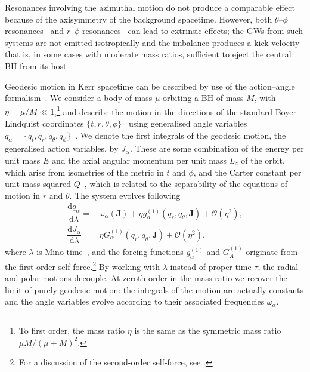\documentclass[aps,prd,amsfonts,amssymb,amsmath,nofootinbib,showpacs,superscriptaddress,twocolumn,floatfix]{revtex4-1}
\newcommand{\dd}{\ensuremath{\mathrm{d}}}
\newcommand{\diff}[2]{\ensuremath{\dfrac{\dd {#1}}{\dd {#2}}}}
\newcommand{\order}[1]{\ensuremath{\mathcal{O}({#1})}}
\begin{document}
Resonances involving the azimuthal motion do not produce a comparable effect because of the axisymmetry of the background spacetime. However, both $\theta$--$\phi$ resonances~\cite{Hirata2011} and $r$--$\phi$ resonances~\cite{VanDeMeent2013} can lead to extrinsic effects; the GWs from such systems are not emitted isotropically and the imbalance produces a kick velocity that is, in some cases with moderate mass ratios, sufficient to eject the central BH from its host~\cite{VanDeMeent2014}.

Geodesic motion in Kerr spacetime can be described by use of the action--angle formalism~\cite{Goldstein2002}. %
We consider a body of mass $\mu$ orbiting a BH of mass $M$, with $\eta = \mu/M \ll 1$,\footnote{To first order, the mass ratio $\eta$ is the same as the symmetric mass ratio $\mu M/(\mu+M)^2$.} and describe the motion in the directions of the standard Boyer--Lindquist coordinates $\{t,r,\theta,\phi\}$~\cite{Boyer1967} using generalised angle variables $q_\alpha = \{q_t,q_r,q_\theta,q_\phi\}$~\cite{Hinderer2008}. We denote the first integrals of the geodesic motion, the generalised action variables, by $J_\alpha$. These are some combination of the energy per unit mass $E$ and the axial angular momentum per unit mass $L_z$ of the orbit, which arise from isometries of the metric in $t$ and $\phi$, and the Carter constant per unit mass squared $Q$~\cite{Carter1968}, which is related to the separability of the equations of motion in $r$ and $\theta$. The system evolves following~\cite{Flanagan2012}
\begin{subequations}
\label{eq:Mino-E-o-M}
\begin{align}
\diff{q_\alpha}{\lambda} = {} & \omega_\alpha(\boldsymbol{J}) + \eta g_\alpha^{(1)}(q_r,q_\theta,\boldsymbol{J}) + \order{\eta^2}, \\
\diff{J_\alpha}{\lambda} = {} & \eta G_\alpha^{(1)}(q_r,q_\theta,\boldsymbol{J}) + \order{\eta^2},
\end{align}
\end{subequations}
where $\lambda$ is Mino time~\cite{Mino2003}, and the forcing functions $g_\alpha^{(1)}$ and $G_A^{(1)}$ originate from the first-order self-force.\footnote{For a discussion of the second-order self-force, see \cite{Rosenthal2006,Pound2012,Gralla2012}.} By working with $\lambda$ instead of proper time $\tau$, the radial and polar motions decouple. At zeroth order in the mass ratio we recover the limit of purely geodesic motion: the integrals of the motion are actually constants and the angle variables evolve according to their associated frequencies $\omega_\alpha$.
\end{document}

